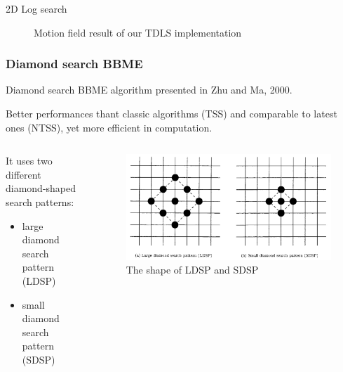 \documentclass[aspectratio=1610,xcolor=dvipsnames]{beamer}
\begin{document}
\begin{frame}{2D Log search}
\begin{figure}
\begin{minipage}{.45\textwidth}
            \label{fig:bbme-2-res}
		\end{minipage}
        \label{fig:bbme-2}
        \caption{Motion field result of our TDLS implementation}
	\end{figure}
\end{frame}

\subsubsection*{Diamond search BBME}
\begin{frame}{Diamond search}
	BBME algorithm presented in Zhu and Ma, 2000. 
    \bigskip
    
    Better performances thant classic algorithms (TSS) and comparable to latest ones (NTSS), yet more efficient in computation.
    \bigskip
    \begin{columns}
        \begin{column}{0.5\textwidth}
            It uses two different  diamond-shaped search patterns:
            \begin{itemize}
                \item large diamond search pattern (LDSP)
                \item small diamond search pattern (SDSP)
            \end{itemize}
        \end{column}
        \begin{column}{0.5\textwidth}
            \begin{figure}
                \centering
                \includegraphics[keepaspectratio,width=\linewidth]{images/ds-search-patterns.png}
                \caption{The shape of LDSP and SDSP}
            \end{figure}
        \end{column}
    \end{columns}
\end{frame}
\end{document}
